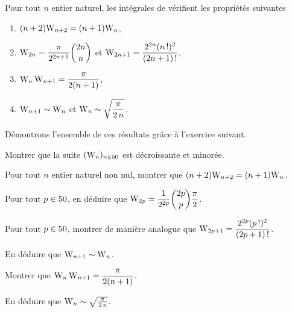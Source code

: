 \begin{theo}{}  Pour tout $n$ entier naturel, les intégrales de  vérifient les propriétés suivantes
\begin{enumerate}[label=(\roman*)]
    \item $(n + 2) \mathrm{W}_{n+2} = (n + 1) \mathrm{W}_n$,  
    \item $\displaystyle \mathrm{W}_{2n} = \frac{\pi}{2^{2n+1}} \binom{2n}{n}$ et $\displaystyle \mathrm{W}_{2n+1} = \frac{2^{2n} (n\,!)^2}{(2n+1)\,!}$,
    \item $\displaystyle \mathrm{W}_n \, \mathrm{W}_{n+1} = \frac{\pi}{2(n+1)}$,
    \item $\mathrm{W}_{n+1} \sim \mathrm{W}_n$ et $\displaystyle \mathrm{W}_n \sim \sqrt{\frac{\pi}{2 \, n}}$.
\end{enumerate}
\end{theo}
Démontrons l'ensemble de ces résultats grâce à l'exercice suivant.
\begin{exercice}\label{exo:propWallis}
\begin{questions}
\item Montrer que la suite $(\mathrm{W}_n)_{n\in50}$ est décroissante et minorée.

\item Pour tout $n$ entier naturel non nul, montrer que $(n + 2) \mathrm{W}_{n+2} = (n + 1) \mathrm{W}_n$.

\item Pour tout $p \in 50$, en déduire que $\displaystyle \mathrm{W}_{2p} = \frac{1}{2^{2p}} \binom{2p}{p} \frac{\pi}{2}$.

\item Pour tout $p \in 50$, montrer de manière analogue que $\displaystyle \mathrm{W}_{2p+1} = \frac{2^{2p} (p\,!)^2}{(2p+1)\,!}$.

\item En déduire que $\mathrm{W}_{n+1} \sim \mathrm{W}_n$.

\item Montrer que $\displaystyle \mathrm{W}_n \, \mathrm{W}_{n+1} = \frac{\pi}{2 (n + 1)}$.

\item En déduire que $\mathrm{W}_n \sim \sqrt{\frac{\pi}{2 \, n}}$.
\end{questions}
\end{exercice}

